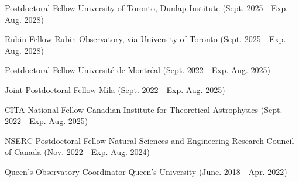 

\begin{cvskills}

  \cvskill
    {Postdoctoral Fellow} %
    {\href{https://www.dunlap.utoronto.ca/}{University of Toronto, Dunlap Institute} (Sept. 2025 - Exp. Aug. 2028)}

 \cvskill
    {Rubin Fellow} %
    {\href{https://rubinobservatory.org/}{Rubin Observatory, via University of Toronto} (Sept. 2025 - Exp. Aug. 2028)}

\end{cvskills}

\begin{cvskills}

  \cvskill
    {Postdoctoral Fellow} %
    {\href{https://www.umontreal.ca/en/}{Universit{\'e} de Montr{\'e}al} (Sept. 2022 - Exp. Aug. 2025)}

  \cvskill
    {Joint Postdoctoral Fellow} %
    {\href{https://mila.quebec/en/}{Mila} (Sept. 2022 - Exp. Aug. 2025)}   
    
  \cvskill
    {CITA National Fellow} %
    {\href{https://www.cita.utoronto.ca/}{Canadian Institute for Theoretical Astrophysics} (Sept. 2022 - Exp. Aug. 2025)}

  \cvskill
    {NSERC Postdoctoral Fellow} %
    {\href{https://www.nserc-crsng.gc.ca/Students-Etudiants/PD-NP/PDF-BP_eng.asp}{Natural Sciences and Engineering Research Council of Canada} (Nov. 2022 - Exp. Aug. 2024)}
    
  \cvskill
    {Queen's Observatory Coordinator}
    {\href{https://www.queensu.ca/}{Queen's University} (June. 2018 - Apr. 2022)}
    
\end{cvskills}

